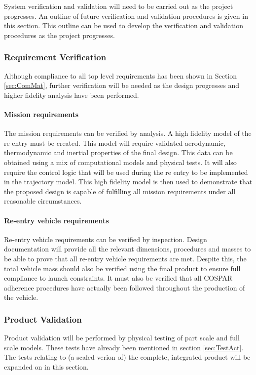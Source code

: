 System verification and validation will need to be carried out as the project progresses. An outline of future verification and validation procedures is given in this section. This outline can be used to develop the verification and validation procedures as the project progresses. 

\subsubsection{Requirement Verification}
\label{sec:ReqVer}
Although compliance to all top level requirements has been shown in Section \ref{sec:ComMat}, further verification will be needed as the design progresses and higher fidelity analysis have been performed. 

\paragraph{Mission requirements}
The mission requirements can be verified by analysis. A high fidelity model of the re entry must be created. This model will require validated aerodynamic, thermodynamic and inertial properties of the final design. This data can be obtained using a mix of computational models and physical tests. It will also require the control logic that will be used during the re entry to be implemented in the trajectory model. This high fidelity model is then used to demonstrate that the proposed design is capable of fulfilling all mission requirements under all reasonable circumstances. 

\paragraph{Re-entry vehicle requirements}
Re-entry vehicle requirements can be verified by inspection. Design documentation will provide all the relevant dimensions, procedures and masses to be able to prove that all re-entry vehicle requirements are met. Despite this, the total vehicle mass should also be verified using the final product to ensure full compliance to launch constraints. It must also be verified that all COSPAR adherence procedures have actually been followed throughout the production of the vehicle. 

\subsubsection{Product Validation}
Product validation will be performed by physical testing of part scale and full scale models. These tests have already been mentioned in section \ref{sec:TestAct}. The tests relating to (a scaled verion of) the complete, integrated product will be expanded on in this section.  

